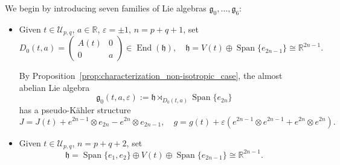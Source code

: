 \documentclass{article}
\theoremstyle{definition}
\DeclareMathOperator{\End}{End}
\newcommand{\R}{\mathbb{R}}
\newcommand{\frh}{\mathfrak{h}}
\newcommand{\Span}[1]{\operatorname{Span}\{#1\}}
\newcommand{\lie}[1]{\mathfrak{#1}}
\newcommand{\g}{\lie g}
\begin{document}
We begin by introducing seven families of Lie algebras $\g_0,\dotsc,\g_6$:

\begin{itemize}
    \item Given $t\in\mathcal{U}_{p,q}$, $a\in\R$, $\varepsilon=\pm1$, $n=p+q+1$, set $$D_0(t,a)=\begin{pmatrix}
        A(t)&0\\
        0&a
    \end{pmatrix}\in\End(\frh), \quad \frh=V(t)\oplus\Span{e_{2n-1}}\cong\R^{2n-1}.$$

    By Proposition~\ref{prop:characterization_non-isotropic_case}, the almost abelian Lie algebra $$\g_0(t,a,\varepsilon):=\frh\rtimes_{D_0(t,a)}\Span{e_{2n}}$$ has a pseudo-Kähler structure $$J=J(t)+e^{2n-1}\otimes e_{2n}-e^{2n}\otimes e_{2n-1}, \quad g=g(t)+\varepsilon (e^{2n-1}\otimes e^{2n-1}+e^{2n}\otimes e^{2n}).$$
    \item Given $t\in\mathcal{U}_{p,q}$, $n=p+q+2$, set $$\frh=\Span{e_1,e_2}\oplus V(t) \oplus \Span{e_{2n-1}}\cong\R^{2n-1}.$$


\end{itemize}
\end{document}
